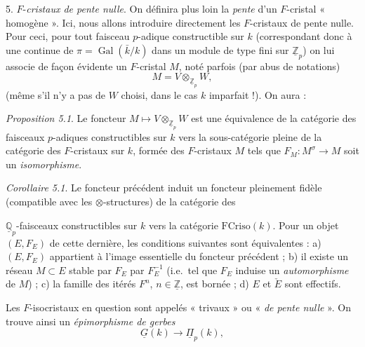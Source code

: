 \documentclass[11pt,a4paper]{article}
\begin{document}
5. \quad $F$-\emph{cristaux de  pente nulle}. On définira
plus loin la \emph{pente} d'un $F$-cristal « homogène ». Ici, nous
allons introduire directement les $F$-cristaux de pente nulle. Pour ceci,
pour tout faisceau $p$-adique constructible  sur $k$ (correspondant
donc à une   continue de
$\pi = \operatorname{Gal}(\bar{k}/k)$ dans un module de type fini sur
$\underline{\mathbb{Z}}_{p}$) on lui associe de façon évidente un $F$-cristal
$M$, noté parfois (par abus de notations)
\[
M = V \otimes_{\underline{\mathbb{Z}}_{p}} W ,
\]
(même s'il n'y a pas de $W$ choisi, dans le cas $k$ imparfait !). On aura :

\emph{Proposition 5.1}. Le foncteur
$M \mapsto V \otimes_{\underline{\mathbb{Z}}_{p}} W$ est une équivalence de
la catégorie des faisceaux $p$-adiques constructibles sur $k$ vers la
sous-catégorie pleine de la catégorie des $F$-cristaux  sur $k$,
formée des $F$-cristaux $M$ tels que
$F_{M} : M^{\sigma} \to M$ soit un \emph{isomorphisme}.

\emph{Corollaire 5.1}. Le foncteur précédent induit un foncteur
pleinement fidèle (compatible avec les $\otimes$-structures)
 de la catégorie des

$\underline{\mathbb{Q}}_{p}$-faisceaux constructibles sur $k$ vers la
catégorie $\mathrm{FCriso}(k)$. Pour un objet \struck{\ill{}} $(E, F_{E})$ de
cette dernière, les conditions suivantes sont équivalentes
 : a) $(E, F_{E})$ appartient à l'image essentielle du
foncteur précédent ; \quad b) il existe un réseau $M \subset E$ stable par
$F_{E}$   par $F_{E}^{-1}$ (i.e.\ tel que $F_{E}$ induise
un \emph{automorphisme} de $M$) ; \quad c) la famille des itérés
$F^{n}$, $n \in \underline{\mathbb{Z}}$, est bornée ; \quad d) $E$ et
$\check{E}$ sont effectifs.

Les $F$-isocristaux en question sont appelés « trivaux » ou
« \emph{de pente nulle} ». On trouve ainsi un
\emph{épimorphisme de gerbes}
\[
\underline{G}(k) \longrightarrow \underline{\Pi}_{p}(k) ,
\]

\end{document}
